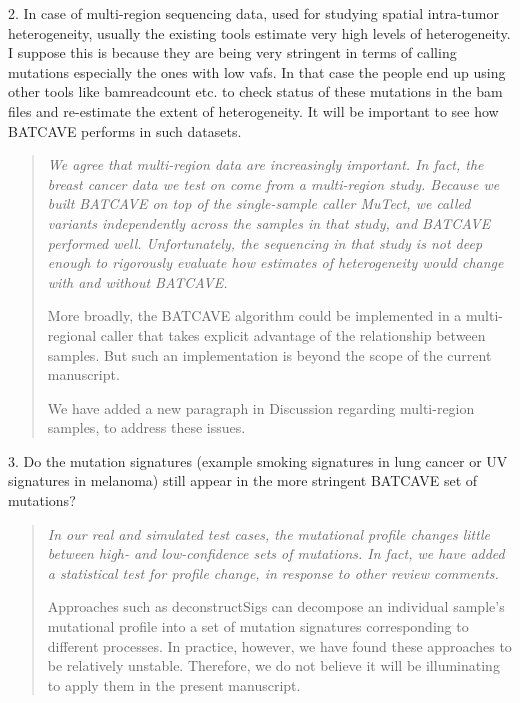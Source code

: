 \documentclass[11pt]{article}
\newenvironment{response}
{\begin{quote}\itshape}
{\end{quote}}
\begin{document}
2. In case of multi-region sequencing data, used for studying spatial intra-tumor heterogeneity, usually the existing tools estimate very high levels of heterogeneity. I suppose this is because they are being very stringent in terms of calling mutations especially the ones with low vafs. In that case the people end up using other tools like bamreadcount etc. to check status of these mutations in the bam files and re-estimate the extent of heterogeneity. It will be important to see how BATCAVE performs in such datasets.
\begin{response}
We agree that multi-region data are increasingly important.
In fact, the breast cancer data we test on come from a multi-region study. 
Because we built BATCAVE on top of the single-sample caller MuTect, we called variants independently across the samples in that study, and BATCAVE performed well.
Unfortunately, the sequencing in that study is not deep enough to rigorously evaluate how estimates of heterogeneity would change with and without BATCAVE.

More broadly, the BATCAVE algorithm could be implemented in a multi-regional caller that takes explicit advantage of the relationship between samples.
But such an implementation is beyond the scope of the current manuscript.

We have added a new paragraph in Discussion regarding multi-region samples, to address these issues.
\end{response}

3. Do the mutation signatures (example smoking signatures in lung cancer or UV signatures in melanoma) still appear in the more stringent BATCAVE set of mutations?
\begin{response}
In our real and simulated test cases, the mutational profile changes little between high- and low-confidence sets of mutations.
In fact, we have added a statistical test for profile change, in response to other review comments.

Approaches such as deconstructSigs can decompose an individual sample's mutational profile into a set of mutation signatures corresponding to different processes.
In practice, however, we have found these approaches to be relatively unstable.
Therefore, we do not believe it will be illuminating to apply them in the present manuscript.
\end{response}
\end{document}
